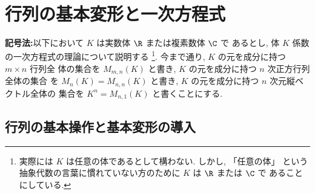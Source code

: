 \documentclass[12pt,twoside]{jarticle}
\newcommand\commentout[1]{#1}
\newcommand\commentout[1]{}
\begin{document}
%
%






\section{行列の基本変形と一次方程式}

\noindent
{\large 
{\bf 記号法:}\enspace 以下において $K$ は実数体 $\R$ または複素数体 $\C$ で
あるとし, 体 $K$ 係数の一次方程式の理論について説明する%
\footnote{実際には $K$ は任意の体であるとして構わない. しかし, 「任意の体」
  という抽象代数の言葉に慣れていない方のために $K$ は $\R$ または $\C$ で
  あることにしている.}.  今まで通り, $K$ の元を成分に持つ $m\times n$ 行列全
体の集合を $M_{m,n}(K)$ と書き, $K$ の元を成分に持つ $n$ 次正方行列全体の集合
を $M_n(K)=M_{n,n}(K)$ と書き, $K$ の元を成分に持つ $n$ 次元縦ベクトル全体の
集合を $K^n = M_{n,1}(K)$ と書くことにする.
}


\subsection{行列の基本操作と基本変形の導入}
\label{sec:elem-op-tr}
\end{document}
